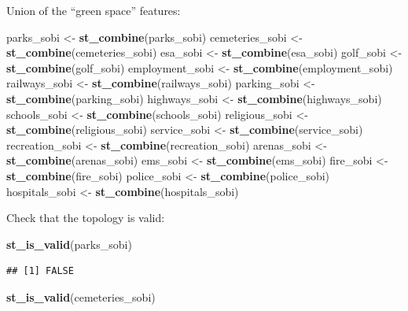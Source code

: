 \documentclass[
]{article}
\newenvironment{Shaded}{\begin{snugshade}}{\end{snugshade}}
\newcommand{\KeywordTok}[1]{\textcolor[rgb]{0.13,0.29,0.53}{\textbf{#1}}}
\newcommand{\NormalTok}[1]{#1}
\newcommand{\StringTok}[1]{\textcolor[rgb]{0.31,0.60,0.02}{#1}}
\begin{document}
Union of the ``green space'' features:

\begin{Shaded}
\begin{Highlighting}[]
\NormalTok{parks_sobi <-}\StringTok{ }\KeywordTok{st_combine}\NormalTok{(parks_sobi)}
\NormalTok{cemeteries_sobi <-}\StringTok{ }\KeywordTok{st_combine}\NormalTok{(cemeteries_sobi)}
\NormalTok{esa_sobi <-}\StringTok{ }\KeywordTok{st_combine}\NormalTok{(esa_sobi)}
\NormalTok{golf_sobi <-}\StringTok{ }\KeywordTok{st_combine}\NormalTok{(golf_sobi)}
\NormalTok{employment_sobi <-}\StringTok{ }\KeywordTok{st_combine}\NormalTok{(employment_sobi)}
\NormalTok{railways_sobi <-}\StringTok{ }\KeywordTok{st_combine}\NormalTok{(railways_sobi)}
\NormalTok{parking_sobi <-}\StringTok{ }\KeywordTok{st_combine}\NormalTok{(parking_sobi)}
\NormalTok{highways_sobi <-}\StringTok{ }\KeywordTok{st_combine}\NormalTok{(highways_sobi)}
\NormalTok{schools_sobi <-}\StringTok{ }\KeywordTok{st_combine}\NormalTok{(schools_sobi)}
\NormalTok{religious_sobi <-}\StringTok{ }\KeywordTok{st_combine}\NormalTok{(religious_sobi)}
\NormalTok{service_sobi <-}\StringTok{ }\KeywordTok{st_combine}\NormalTok{(service_sobi)}
\NormalTok{recreation_sobi <-}\StringTok{ }\KeywordTok{st_combine}\NormalTok{(recreation_sobi)}
\NormalTok{arenas_sobi <-}\StringTok{ }\KeywordTok{st_combine}\NormalTok{(arenas_sobi)}
\NormalTok{ems_sobi <-}\StringTok{ }\KeywordTok{st_combine}\NormalTok{(ems_sobi)}
\NormalTok{fire_sobi <-}\StringTok{ }\KeywordTok{st_combine}\NormalTok{(fire_sobi)}
\NormalTok{police_sobi <-}\StringTok{ }\KeywordTok{st_combine}\NormalTok{(police_sobi)}
\NormalTok{hospitals_sobi <-}\StringTok{ }\KeywordTok{st_combine}\NormalTok{(hospitals_sobi)}
\end{Highlighting}
\end{Shaded}

Check that the topology is valid:

\begin{Shaded}
\begin{Highlighting}[]
\KeywordTok{st_is_valid}\NormalTok{(parks_sobi)}
\end{Highlighting}
\end{Shaded}

\begin{verbatim}
## [1] FALSE
\end{verbatim}

\begin{Shaded}
\begin{Highlighting}[]
\KeywordTok{st_is_valid}\NormalTok{(cemeteries_sobi)}
\end{Highlighting}
\end{Shaded}
\end{document}
